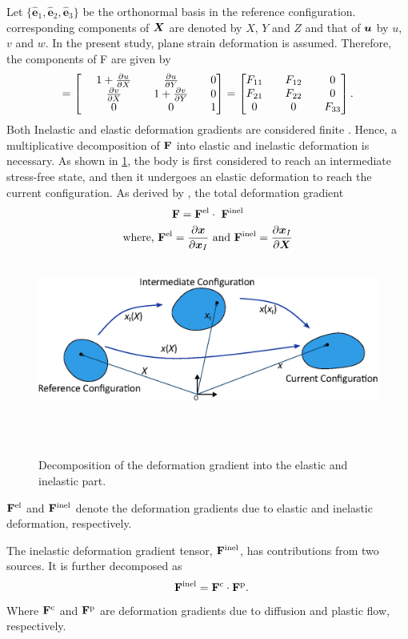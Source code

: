 Let $\{\hat{\bm{e}}_1, \hat{\bm{e}}_2, \hat{\bm{e}}_3\}$ be the orthonormal basis in the reference configuration. corresponding components of ${\bm{X}}$ are denoted by $X$, $Y$ and $Z$ and that of ${\bm{u}}$ by $u$, $v$ and $w$. In the present study, plane strain deformation is assumed. Therefore, the components of F are given by \citep{2009ContMechLai} 
\begin{align}
[\F] = 
\begin{bmatrix}
       1 + \pdiff{u}{X} && \pdiff{u}{Y} && 0 \\
       \pdiff{v}{X} && 1 + \pdiff{v}{Y} && 0 \\
       0 && 0 && 1
\end{bmatrix} = \tensor{F}. \label{eq:F_tensor}
\end{align}
Both Inelastic and elastic deformation gradients are considered finite \citep{2011JMPSBower}. Hence, a multiplicative decomposition of $\mathbf{F}$ into elastic and inelastic deformation is necessary. As shown in \ref{fig:decomposition}, the body is first considered to reach an intermediate stress-free state, and then it undergoes an elastic deformation to reach the current configuration. As derived by \citet{1969Lee}, the total deformation gradient   
\begin{gather}
\F = \F^{\el} \cdot  \F^{\inel} \label{eq:F_decomposition} \\
\text{where, } \F^{\el} = \pdiff{\x}{\x_I} \text{ and } \F^{\inel} = \pdiff{\x_{I}}{\X} \nonumber
\end{gather}
\begin{figure}[H]
    \centering
    \includegraphics[width=\textwidth]{figures/mathFormFigs/decomposition.eps}
    \caption{Decomposition of the deformation gradient into the elastic and inelastic part.}
    \label{fig:decomposition}
\end{figure}
$\mathbf{F}^{{\rm{el}}}$ and $\mathbf{F}^{{\rm{inel}}}$ denote the deformation gradients due to elastic and inelastic deformation, respectively.

The inelastic deformation gradient tensor, $\mathbf{F}^{{\rm{inel}}}$, has contributions from two sources. It is further decomposed as 
\begin{gather}
    \F^\inel = \F^\c \cdot \F^\p. \label{eq:Finel_decomposition}
\end{gather}
Where $\mathbf{F}^{\rm{c}}$ and $\mathbf{F}^{\rm{p}}$ are deformation gradients due to diffusion and plastic flow, respectively.

